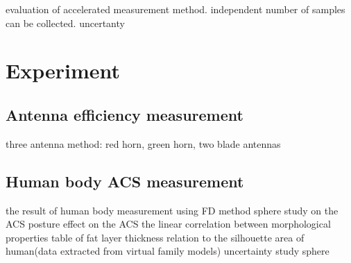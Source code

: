 \documentclass{article}
\begin{document}
evaluation of accelerated measurement method.
independent number of samples can be collected. uncertanty



\section{Experiment}
\subsection{Antenna efficiency measurement}
three antenna method: red horn, green horn, two blade antennas
\subsection{Human body ACS measurement}
the result of human body measurement using FD method
sphere study on the ACS
posture effect on the ACS
the linear correlation between morphological properties
table of fat layer thickness
relation to the silhouette area of human(data extracted from virtual family
models)
uncertainty study
sphere
\end{document}
